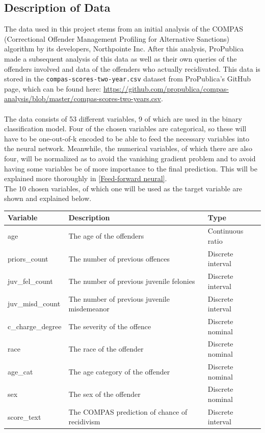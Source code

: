 \documentclass[11pt, fleqn, titlepage]{article}
\begin{document}
	\subsection{Description of Data}
	The data used in this project stems from an initial analysis of the COMPAS (Correctional Offender Management Profiling for Alternative Sanctions) algorithm by its developers, Northpointe Inc. After this analysis, ProPublica made a subsequent analysis of this data as well as their own queries of the offenders involved and data of the offenders who actually recidivated. This data is stored in the \texttt{compas-scores-two-year.csv} dataset from ProPublica's GitHub page, which can be found here: \url{https://github.com/propublica/compas-analysis/blob/master/compas-scores-two-years.csv}. \\\\
	\noindent The data consists of 53 different variables, 9 of which are used in the binary classification model. Four of the chosen variables are categorical, so these will have to be one-out-of-k encoded to be able to feed the necessary variables into the neural network. Meanwhile, the numerical variables, of which there are also four, will be normalized as to avoid the vanishing gradient problem and to avoid having some variables be of more importance to the final prediction. This will be explained more thoroughly in \ref{Feed-forward neural}. \\
	The 10 chosen variables, of which one will be used as the target variable are shown and explained below.
	
	
	\begin{table}[H]\label{resultater}
		\centering
		\begin{tabular}{l l l}
			Variable & Description & Type \\ \hline
			age & The age of the offenders & Continuous ratio \\
			priors\_count & The number of previous offences & Discrete interval \\
			juv\_fel\_count & The number of previous juvenile felonies & Discrete interval \\
			juv\_misd\_count & The number of previous juvenile misdemeanor & Discrete interval \\
			c\_charge\_degree & The severity of the offence & Discrete nominal \\
			race & The race of the offender & Discrete nominal \\
			age\_cat & The age category of the offender & Discrete nominal \\
			sex & The sex of the offender & Discrete nominal \\
			score\_text & The COMPAS prediction of chance of recidivism & Discrete interval
		\end{tabular}
	\end{table}
		
\end{document}
